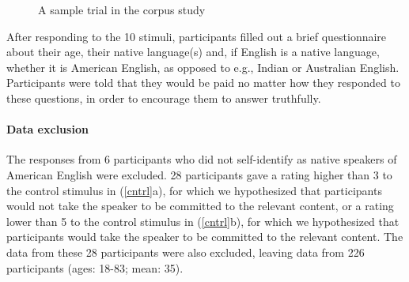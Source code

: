 \documentclass[11pt,fleqn]{article}
\newcommand{\6}{\mbox{$[\hspace*{-.6mm}[$}}
\newcommand{\9}{\mbox{$]\hspace*{-.6mm}]$}}
\begin{document}
\begin{figure}[h!]
\begin{center}
\end{center}
\caption{A sample trial in the corpus study}\label{f-corpus-trial}
\end{figure}

After responding to the 10 stimuli, 
participants filled out a brief questionnaire about their age, their
native language(s) and, if English is a native language, whether it is
American English, as opposed to e.g., Indian or Australian English.
Participants were told that they would be paid no matter how they
responded to these questions, in order to encourage them to answer
truthfully. 

\paragraph{Data exclusion} The responses from 6 participants who did not self-identify as native speakers of American English were excluded. 28 participants gave a rating higher than 3 to the control stimulus in (\ref{cntrl}a), for which we hypothesized that participants would not take the speaker to be committed to the relevant content, or a rating lower than 5 to the control stimulus in (\ref{cntrl}b), for which we hypothesized that participants would take the speaker to be committed to the relevant content. The data from these 28 participants were also excluded, leaving data from 226 participants (ages: 18-83; mean: 35).
\end{document}
